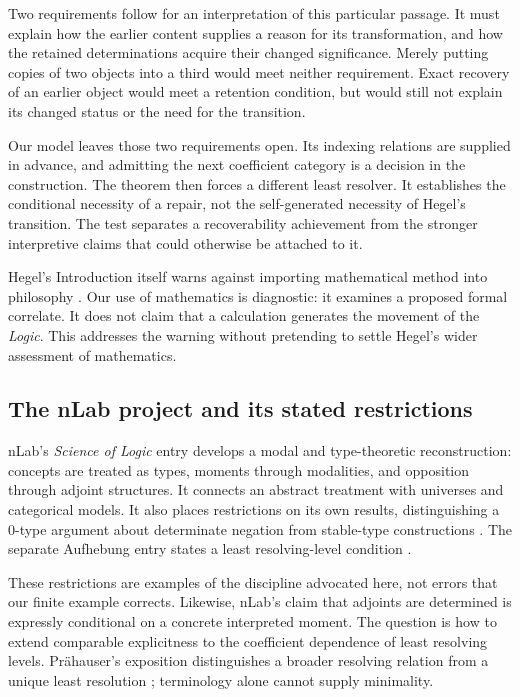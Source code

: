 Two requirements follow for an interpretation of this particular passage.
It must explain how the earlier content supplies a reason for its
transformation, and how the retained determinations acquire their changed
significance. Merely putting copies of two objects into a third would meet
neither requirement. Exact recovery of an earlier object would meet a
retention condition, but would still not explain its changed status or
the need for the transition.

Our model leaves those two requirements open. Its indexing relations
are supplied in advance, and admitting the next coefficient category is
a decision in the construction. The theorem then forces a different least
resolver. It establishes the conditional necessity of a repair, not the
self-generated necessity of Hegel's transition. The test separates a
recoverability achievement from the stronger interpretive claims that
could otherwise be attached to it.

Hegel's Introduction itself warns against importing mathematical method
into philosophy \cite[online paragraph 62]{HegelIntro}. Our use of
mathematics is diagnostic: it examines a proposed formal correlate. It
does not claim that a calculation generates the movement of the
\emph{Logic}. This addresses the warning without pretending to settle
Hegel's wider assessment of mathematics.

\subsection{The nLab project and its stated restrictions}

nLab's \emph{Science of Logic} entry develops a modal and type-theoretic
reconstruction: concepts are treated as types, moments through modalities,
and opposition through adjoint structures. It connects an abstract treatment
with universes and categorical models. It also places restrictions on its own
results, distinguishing a 0-type argument about determinate negation from
stable-type constructions \cite{nLabLogic}. The separate Aufhebung entry
states a least resolving-level condition \cite{nLabAufhebung}.

These restrictions are examples of the discipline advocated here, not
errors that our finite example corrects. Likewise, nLab's claim that
adjoints are determined is expressly conditional on a concrete interpreted
moment. The question is how to extend comparable explicitness to the
coefficient dependence of least resolving levels. Pr\"ahauser's exposition
distinguishes a broader resolving relation from a unique least
resolution \cite{Praehauser}; terminology alone cannot supply minimality.

